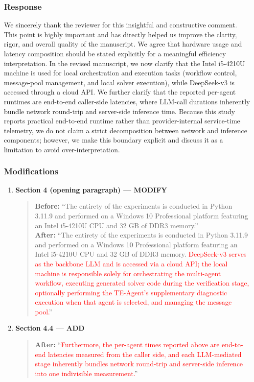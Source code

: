 \documentclass[11pt,a4paper]{article}
\begin{document}
\subsubsection{Response}
We sincerely thank the reviewer for this insightful and constructive comment. This point is highly important and has directly helped
us improve the clarity, rigor, and overall quality of the manuscript. We agree that hardware usage and latency composition should be stated explicitly for a meaningful efficiency interpretation. In the revised manuscript, we now clarify that the Intel i5-4210U machine is used for local orchestration and execution tasks (workflow control, message-pool management, and local solver execution), while DeepSeek-v3 is accessed through a cloud API. We further clarify that the reported per-agent runtimes are end-to-end caller-side latencies, where LLM-call durations inherently bundle network round-trip and server-side inference time. Because this study reports practical end-to-end runtime rather than provider-internal service-time telemetry, we do not claim a strict decomposition between network and inference components; however, we make this boundary explicit and discuss it as a limitation to avoid over-interpretation.

\subsubsection{Modifications}
\begin{enumerate}
\item \textbf{Section 4 (opening paragraph) --- MODIFY}
\begin{quote}
\textbf{Before:} ``The entirety of the experiments is conducted in Python 3.11.9 and performed on a Windows 10 Professional platform featuring an Intel i5-4210U CPU and 32 GB of DDR3 memory.''\\[4pt]
\textbf{After:} ``The entirety of the experiments is conducted in Python 3.11.9 and performed on a Windows 10 Professional platform featuring an Intel i5-4210U CPU and 32 GB of DDR3 memory. \textcolor{red}{DeepSeek-v3 serves as the backbone LLM and is accessed via a cloud API; the local machine is responsible solely for orchestrating the multi-agent workflow, executing generated solver code during the verification stage, optionally performing the TE-Agent's supplementary diagnostic execution when that agent is selected, and managing the message pool.}''
\end{quote}

\item \textbf{Section 4.4 --- ADD}
\begin{quote}
\textbf{After:} ``\textcolor{red}{Furthermore, the per-agent times reported above are end-to-end latencies measured from the caller side, and each LLM-mediated stage inherently bundles network round-trip and server-side inference into one indivisible measurement.}''
\end{quote}
\end{enumerate}
\end{document}
